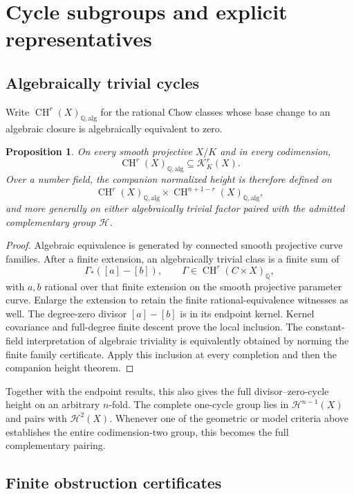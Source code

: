 \documentclass[11pt,a4paper]{article}
\newtheorem{proposition}[theorem]{Proposition}
\theoremstyle{definition}
\theoremstyle{remark}\newtheorem{remark}[theorem]{Remark}
\numberwithin{equation}{section}
\newcommand{\Q}{\mathbb Q}\newcommand{\R}{\mathbb R}\newcommand{\C}{\mathbb C}
\newcommand{\CH}{\operatorname{CH}}\newcommand{\an}{\mathrm{an}}
\newcommand{\alg}{\mathrm{alg}}\newcommand{\geomhom}{\mathrm{geom\,hom}}
\newcommand{\cK}{\mathcal K}\newcommand{\cH}{\mathcal H}
\begin{document}
\section{Cycle subgroups and explicit representatives}\label{sec:cycle-domains}

\subsection{Algebraically trivial cycles}\label{sub:algebraic-triviality}

Write $\CH^r(X)_{\Q,\alg}$ for the rational Chow classes whose
base change to an algebraic closure is algebraically equivalent
to zero.

\begin{proposition}\label{prop:algebraic-triviality}
On every smooth projective $X/K$ and in every codimension,
\[
 \CH^r(X)_{\Q,\alg}\subseteq\cK_K^r(X).
\]
Over a number field, the companion normalized height is therefore
defined on
\[
 \CH^r(X)_{\Q,\alg}\times
 \CH^{n+1-r}(X)_{\Q,\alg},
\]
and more generally on either algebraically trivial factor paired
with the admitted complementary group $\cH$.
\end{proposition}

\begin{proof}
Algebraic equivalence is generated by connected smooth projective
curve families. After a finite extension, an algebraically trivial
class is a finite sum of
\[
 \Gamma_*([a]-[b]),\qquad
 \Gamma\in\CH^r(C\times X)_\Q,
\]
with $a,b$ rational over that finite extension on the smooth
projective parameter curve. Enlarge the extension to retain the
finite rational-equivalence witnesses as well.
The degree-zero divisor $[a]-[b]$ is in its endpoint kernel.
Kernel covariance and full-degree finite descent prove the local
inclusion. The constant-field interpretation of algebraic
triviality is equivalently obtained by norming the finite family
certificate. Apply this inclusion at every completion and then
the companion height theorem.
\end{proof}

Together with the endpoint results, this also gives the full
divisor--zero-cycle height on an arbitrary $n$-fold. The complete
one-cycle group lies in $\cH^{n-1}(X)$ and pairs with
$\cH^2(X)$. Whenever one of the geometric or model criteria above
establishes the entire codimension-two group, this becomes the
full complementary pairing.

\subsection{Finite obstruction certificates}\label{sub:finite-certificates}
\end{document}
